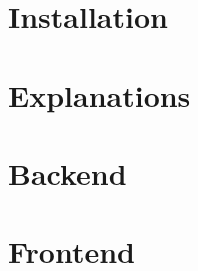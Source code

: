 \documentclass{beamer}
\begin{document}
	\frame{
		\titlepage
	}
	
	
	\section{Installation}
	
	
	\section{Explanations}
	
	
	\section{Backend}
	

	\section{Frontend}
	
\end{document}
